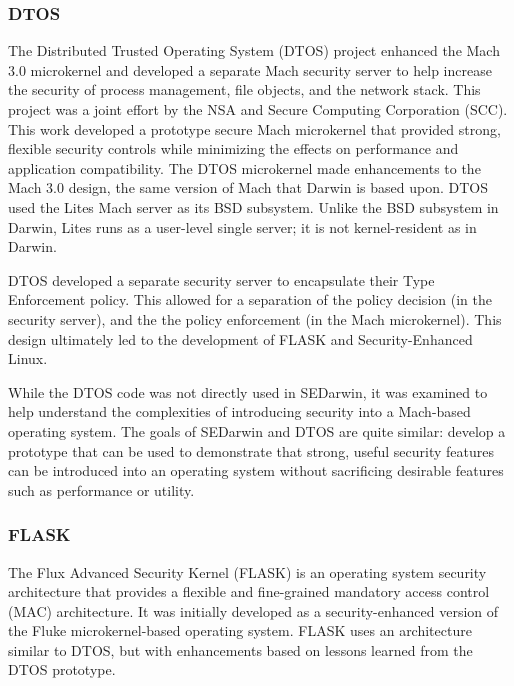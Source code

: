 \subsubsection{DTOS}

The Distributed Trusted Operating System (DTOS) project enhanced
the Mach 3.0 microkernel and developed a separate Mach security
server to help increase the security of process management, file
objects, and the network stack.  This project was a joint effort
by the NSA and Secure Computing Corporation (SCC).  This work
developed a prototype secure Mach microkernel that provided strong,
flexible security controls while minimizing the effects on performance
and application compatibility.\cite{dtos95,dtos96} The DTOS microkernel
made enhancements to the Mach 3.0 design, the same version of Mach
that Darwin is based upon.  DTOS used the Lites\cite{helander94unix} Mach
server as its BSD subsystem.  Unlike the BSD subsystem in Darwin,
Lites runs as a user-level single server; it is not kernel-resident
as in Darwin.

DTOS developed a separate security server to encapsulate their Type
Enforcement policy.  This allowed for a separation of the policy
decision (in the security server), and the the policy enforcement
(in the Mach microkernel).  This design ultimately led to the
development of FLASK and Security-Enhanced Linux.

While the DTOS code was not directly used in SEDarwin, it was
examined to help understand the complexities of introducing security
into a Mach-based operating system.  The goals of SEDarwin and DTOS
are quite similar: develop a prototype that can be used to demonstrate
that strong, useful security features can be introduced into an
operating system without sacrificing desirable features such as
performance or utility.

\subsubsection{FLASK}

The Flux Advanced Security Kernel (FLASK) is an operating system
security architecture that provides a flexible and fine-grained
mandatory access control (MAC) architecture\cite{SSLHAL99}.  It
was initially developed as a security-enhanced version of the Fluke
microkernel-based operating system\cite{ford96microkernels}.  FLASK
uses an architecture similar to DTOS, but with enhancements based
on lessons learned from the DTOS prototype.

